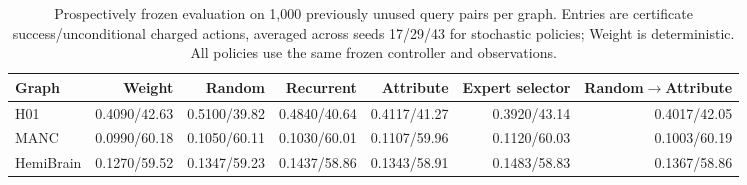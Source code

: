 \begin{table}[h]
\centering\scriptsize
\setlength{\tabcolsep}{3pt}
\caption{Prospectively frozen evaluation on 1,000 previously unused query pairs per graph. Entries are certificate success/unconditional charged actions, averaged across seeds 17/29/43 for stochastic policies; Weight is deterministic. All policies use the same frozen controller and observations.}
\label{tab:fresh-test}
\begin{tabular}{lrrrrrr}
\toprule
Graph & Weight & Random & Recurrent & Attribute & Expert selector & Random$\to$Attribute \\
\midrule
H01 & 0.4090/42.63 & 0.5100/39.82 & 0.4840/40.64 & 0.4117/41.27 & 0.3920/43.14 & 0.4017/42.05 \\
MANC & 0.0990/60.18 & 0.1050/60.11 & 0.1030/60.01 & 0.1107/59.96 & 0.1120/60.03 & 0.1003/60.19 \\
HemiBrain & 0.1270/59.52 & 0.1347/59.23 & 0.1437/58.86 & 0.1343/58.91 & 0.1483/58.83 & 0.1367/58.86 \\
\bottomrule
\end{tabular}
\end{table}

